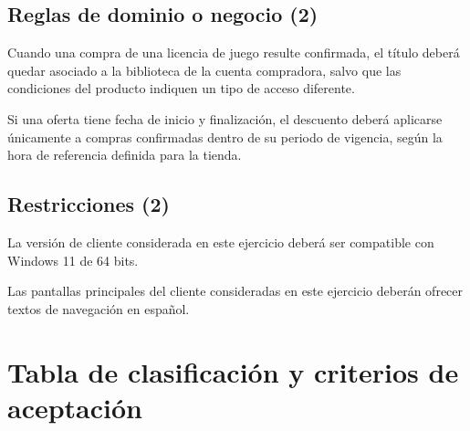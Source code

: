 \documentclass[12pt,a4paper]{article}
\begin{document}
\subsection{Reglas de dominio o negocio (2)}
\begin{description}[leftmargin=!,labelwidth=1.5cm]
\item[RD-01.] Cuando una compra de una licencia de juego resulte confirmada, el título deberá quedar asociado a la biblioteca de la cuenta compradora, salvo que las condiciones del producto indiquen un tipo de acceso diferente.
\item[RD-02.] Si una oferta tiene fecha de inicio y finalización, el descuento deberá aplicarse únicamente a compras confirmadas dentro de su periodo de vigencia, según la hora de referencia definida para la tienda.
\end{description}

\subsection{Restricciones (2)}
\begin{description}[leftmargin=!,labelwidth=1.5cm]
\item[RT-01.] La versión de cliente considerada en este ejercicio deberá ser compatible con Windows 11 de 64 bits.
\item[RT-02.] Las pantallas principales del cliente consideradas en este ejercicio deberán ofrecer textos de navegación en español.
\end{description}

\section{Tabla de clasificación y criterios de aceptación}
\end{document}
